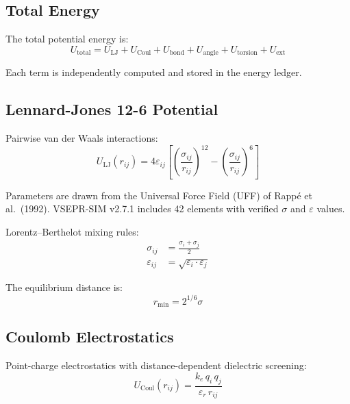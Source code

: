 \documentclass[11pt,twoside]{article}
\newcommand{\rmin}{r_{\mathrm{min}}}
\begin{document}
\subsection{Total Energy}

The total potential energy is:
\begin{equation}
  U_{\mathrm{total}} = U_{\mathrm{LJ}} + U_{\mathrm{Coul}} + U_{\mathrm{bond}} + U_{\mathrm{angle}} + U_{\mathrm{torsion}} + U_{\mathrm{ext}}
  \label{eq:Utotal}
\end{equation}

Each term is independently computed and stored in the energy ledger.

\subsection{Lennard-Jones 12-6 Potential}

Pairwise van der Waals interactions:
\begin{equation}
  U_{\mathrm{LJ}}(r_{ij}) = 4\varepsilon_{ij} \left[
    \left(\frac{\sigma_{ij}}{r_{ij}}\right)^{12} -
    \left(\frac{\sigma_{ij}}{r_{ij}}\right)^{6}
  \right]
  \label{eq:LJ}
\end{equation}

Parameters are drawn from the Universal Force Field (UFF) of
Rapp\'{e} et al.\ (1992).  VSEPR-SIM v2.7.1 includes 42 elements with
verified $\sigma$ and $\varepsilon$ values.

Lorentz--Berthelot mixing rules:
\begin{align}
  \sigma_{ij} &= \frac{\sigma_i + \sigma_j}{2} \\
  \varepsilon_{ij} &= \sqrt{\varepsilon_i \cdot \varepsilon_j}
\end{align}

The equilibrium distance is:
\begin{equation}
  \rmin = 2^{1/6} \sigma
\end{equation}

\subsection{Coulomb Electrostatics}

Point-charge electrostatics with distance-dependent dielectric screening:
\begin{equation}
  U_{\mathrm{Coul}}(r_{ij}) = \frac{k_e \, q_i \, q_j}{\varepsilon_r \, r_{ij}}
  \label{eq:coulomb}
\end{equation}
\end{document}
